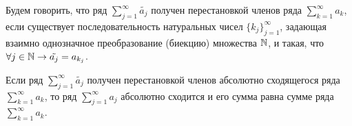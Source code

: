 	\begin{definition}
		Будем говорить, что ряд $\sum_{j = 1}^{\infty} \tilde{a_j}$ получен перестановкой членов ряда $\sum_{k = 1}^{\infty} a_k$, если существует последовательность натуральных чисел $\{k_j\}^{\infty}_{j = 1}$, задающая взаимно однозначное преобразование (биекцию) множества $\mathbb N$, и такая, что $\forall j \in \mathbb N \rightarrow \tilde{a_j} = a_{k_j}$.
	\end{definition}
	
	\begin{theorem}
		Если ряд $\sum^{\infty}_{j = 1} \tilde{a_j}$ получен перестановкой членов абсолютно сходящегося ряда $\sum^{\infty}_{k = 1} a_k$, то ряд $\sum^{\infty}_{j = 1} a_j$ абсолютно сходится и его сумма равна сумме ряда $\sum^{\infty}_{k = 1} a_k$.
	\end{theorem}
	
